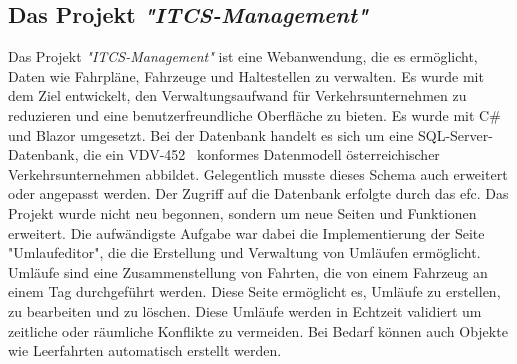 \subsection{Das Projekt \emph{"ITCS-Management"}}\label{sec:itcs-management}
    Das Projekt \emph{"ITCS-Management"} ist eine Webanwendung, die es ermöglicht, Daten wie Fahrpläne, Fahrzeuge und Haltestellen zu verwalten. Es wurde mit dem Ziel entwickelt, den 
    Verwaltungsaufwand für Verkehrsunternehmen zu reduzieren und eine benutzerfreundliche Oberfläche zu bieten. Es wurde mit C\# und Blazor umgesetzt. Bei der Datenbank
    handelt es sich um eine SQL-Server-Datenbank, die ein VDV-452~\cite{VDV452} konformes
    Datenmodell österreichischer Verkehrsunternehmen abbildet. Gelegentlich musste dieses
    Schema auch erweitert oder angepasst werden. Der Zugriff auf die Datenbank erfolgte durch das \gls{efc}. 
    Das Projekt wurde nicht neu begonnen, sondern  um neue Seiten und Funktionen erweitert.
    Die aufwändigste Aufgabe war dabei die Implementierung der Seite "Umlaufeditor", die die Erstellung und Verwaltung von Umläufen ermöglicht. 
    Umläufe sind eine Zusammenstellung von Fahrten, die von einem Fahrzeug an einem Tag durchgeführt werden.
    Diese Seite ermöglicht es, Umläufe zu erstellen, zu bearbeiten und zu löschen. Diese Umläufe werden in Echtzeit validiert um zeitliche oder räumliche Konflikte zu vermeiden. Bei 
    Bedarf können auch Objekte wie Leerfahrten automatisch erstellt werden.

